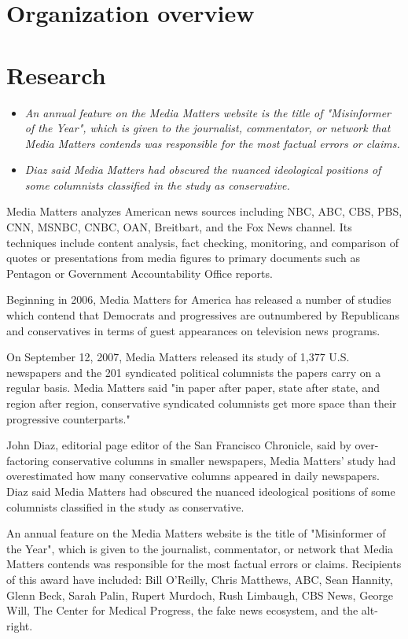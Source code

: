 \section{Organization overview}\label{organization-overview}

\section{Research}\label{research}

\begin{itemize}
\item
  \emph{An annual feature on the Media Matters website is the title of
  "Misinformer of the Year", which is given to the journalist,
  commentator, or network that Media Matters contends was responsible
  for the most factual errors or claims.}
\item
  \emph{Diaz said Media Matters had obscured the nuanced ideological
  positions of some columnists classified in the study as conservative.}
\end{itemize}

Media Matters analyzes American news sources including NBC, ABC, CBS,
PBS, CNN, MSNBC, CNBC, OAN, Breitbart, and the Fox News channel. Its
techniques include content analysis, fact checking, monitoring, and
comparison of quotes or presentations from media figures to primary
documents such as Pentagon or Government Accountability Office reports.

Beginning in 2006, Media Matters for America has released a number of
studies which contend that Democrats and progressives are outnumbered by
Republicans and conservatives in terms of guest appearances on
television news programs.

On September 12, 2007, Media Matters released its study of 1,377 U.S.
newspapers and the 201 syndicated political columnists the papers carry
on a regular basis. Media Matters said "in paper after paper, state
after state, and region after region, conservative syndicated columnists
get more space than their progressive counterparts."

John Diaz, editorial page editor of the San Francisco Chronicle, said by
over-factoring conservative columns in smaller newspapers, Media
Matters' study had overestimated how many conservative columns appeared
in daily newspapers. Diaz said Media Matters had obscured the nuanced
ideological positions of some columnists classified in the study as
conservative.

An annual feature on the Media Matters website is the title of
"Misinformer of the Year", which is given to the journalist,
commentator, or network that Media Matters contends was responsible for
the most factual errors or claims. Recipients of this award have
included: Bill O'Reilly, Chris Matthews, ABC, Sean Hannity, Glenn Beck,
Sarah Palin, Rupert Murdoch, Rush Limbaugh, CBS News, George Will, The
Center for Medical Progress, the fake news ecosystem, and the alt-right.

